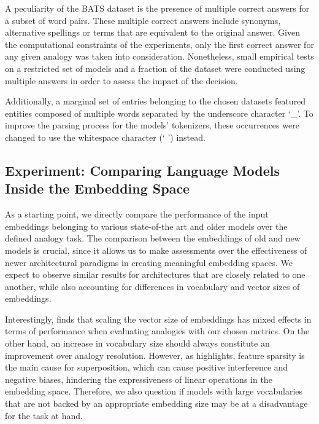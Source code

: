 A peculiarity of the BATS dataset is the presence of multiple correct answers for a subset of word pairs.
These multiple correct answers include synonyms, alternative spellings or terms that are equivalent to the original answer.
Given the computational constraints of the experiments, only the first correct answer for any given analogy was taken into consideration.
Nonetheless, small empirical tests on a restricted set of models and a fraction of the dataset were conducted using multiple answers in order to assess the impact of the decision.

Additionally, a marginal set of entries belonging to the chosen datasets featured entities composed of multiple words separated by the underscore character `\_'.
To improve the parsing process for the models' tokenizers, these occurrences were changed to use the whitespace character (` ') instead.

\subsection{Experiment: Comparing Language Models \texorpdfstring{\linebreak}{} Inside the Embedding Space}\label{ssec:exp_emb_exp1}

As a starting point, we directly compare the performance of the input embeddings belonging to various state-of-the art and older models over the defined analogy task.
The comparison between the embeddings of old and new models is crucial, since it allows us to make assessments over the effectiveness of newer architectural paradigms in creating meaningful embedding spaces.
We expect to observe similar results for architectures that are closely related to one another, while also accounting for differences in vocabulary and vector sizes of embeddings.

Interestingly, \citet{drozd2016} finds that scaling the vector size of embeddings has mixed effects in terms of performance when evaluating analogies with our chosen metrics.
On the other hand, an increase in vocabulary size should always constitute an improvement over analogy resolution.
However, as \citet{elhage2022} highlights, feature sparsity is the main cause for superposition, which can cause positive interference and negative biases, hindering the expressiveness of linear operations in the embedding space.
Therefore, we also question if models with large vocabularies that are not backed by an appropriate embedding size may be at a disadvantage for the task at hand.

